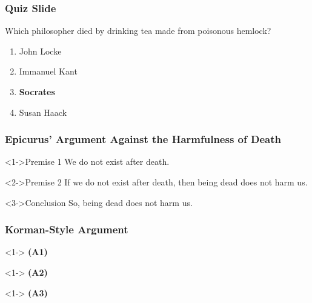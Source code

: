 \documentclass[12pt,presentation,notes]{beamer}
\begin{document}
\begin{frame}
\frametitle{Quiz Slide}

Which philosopher died by drinking tea made from poisonous hemlock?

\begin{enumerate}[\bfseries (A)]
\item<2-5> John Locke
\item<3-5> Immanuel Kant
\item<4-> \textbf<6>{Socrates}
\item<5-5> Susan Haack
\end{enumerate}



\end{frame}

\begin{frame}
\frametitle{Epicurus' Argument Against the Harmfulness of Death}

\begin{block}<1->{Premise 1}
We do not exist after death.
\end{block}
\begin{block}<2->{Premise 2}
If we do not exist after death, then being dead does not harm us.
\end{block}
\begin{block}<3->{Conclusion}
So, being dead does not harm us.
\end{block}

\end{frame}

\begin{frame}
\frametitle{Korman-Style Argument}


\begin{block}<1->{}
\textbf{\alert{(A1)}}\quad   {}
\end{block}
\begin{block}<1->{}
\textbf{\alert{(A2)}}\quad   {}
\end{block}
\begin{block}<1->{}
\textbf{\alert{(A3)}}\quad   {}
\end{block}

\end{frame}
\end{document}
